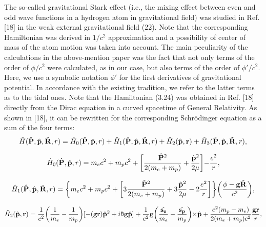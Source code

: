 \documentclass{ws-ijmpd}
\begin{document}
The so-called gravitational Stark effect (i.e., the mixing effect
between even and odd wave functions in a hydrogen atom in gravitational field) was studied in Ref. [18] in the weak external gravitational field (22). Note that the corresponding Hamiltonian was derived in
$1/c^2$ approximation and a possibility of center of mass
of the atom motion was taken into account. The main peculiarity of the calculations in the above-mention paper was the fact that not only
terms of the order of $\phi/c^2$ were calculated, as in our case,
but also terms of the order of $\phi'/c^2$. Here, we use a
symbolic notation $\phi'$ for the first derivatives of
gravitational potential. In accordance with the existing
tradition, we refer to the latter terms as to the tidal ones. Note
that the Hamiltonian (3.24) was obtained in Ref. [18] directly from the
Dirac equation in a curved spacetime of General Relativity. As shown 
in [18], it can be rewritten for the corresponding Schr\"{o}dinger equation as a sum of the four terms:
\begin{equation}
\hat H (\hat {\bf P}, \hat {\bf p}, \tilde {\bf R},r)= \hat H_0
(\hat {\bf P}, \hat {\bf p}, r) + \hat H_1 (\hat {\bf P}, \hat
{\bf p}, \tilde {\bf R},r) + \hat H_2 (\hat {\bf p}, {\bf r}) +
\hat H_3 (\hat {\bf P}, \hat {\bf p},\tilde {\bf R},r) ,
\end{equation}

\begin{equation}
\hat H_0 (\hat {\bf P}, \hat {\bf p}, r) = m_e c^2 + m_p c^2 +
\biggl[\frac{\hat {\bf P}^2}{2(m_e + m_p)} + \frac{\hat {\bf
p}^2}{2 \mu} \biggl] - \frac{e^2}{r} ,
\end{equation}

\begin{equation}
\hat H_1 (\hat {\bf P}, \hat {\bf p}, \tilde {\bf R}, r) =
\biggl\{ m_e c^2 + m_p c^2 +  \biggl[3 \frac{\hat {\bf P}^2}{2(m_e
+ m_p)} + 3 \frac{\hat {\bf p}^2}{2 \mu} - 2 \frac{e^2}{r}
\biggl]\biggl\} \biggl( \frac{\phi  - {\bf g}\tilde {\bf R}}{c^2}
\biggl),
\end{equation}

\begin{equation}
\hat H_2 (\hat {\bf p}, {\bf r}) = \frac{1}{c^2}
\biggl(\frac{1}{m_e}-\frac{1}{m_p} \biggl)[-({\bf g}{\bf r}) \hat
{\bf p}^2 + i \hbar {\bf g} \hat {\bf p}] + \frac{1}{c^2} {\bf g}
\biggl(\frac{\hat {\bf s_e}}{m_e} - \frac{\hat {\bf s_p}}{m_p}
\biggl) \times \hat {\bf p} + \frac{e^2 (m_p-m_e)}{2(m_e+m_p)c^2}
\frac{{\bf g}{\bf r}}{r},
\end{equation}
\end{document}
